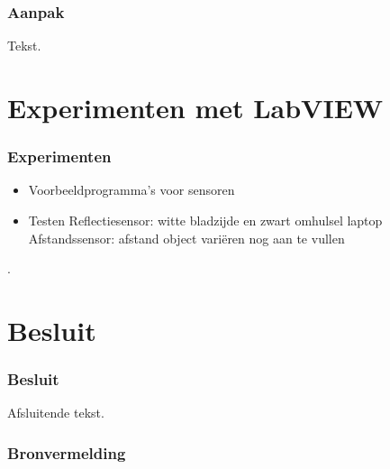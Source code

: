 \documentclass
   [kulak] %
   {kulakbeamer}
\begin{document}
\begin{frame}
\frametitle{Aanpak}
Tekst.
\end{frame}



\section[Experimenten]{Experimenten met LabVIEW}

\begin{frame}
	\frametitle{Experimenten}
	\begin{itemize}
		\item Voorbeeldprogramma's voor sensoren
		\item Testen
		\subitem Reflectiesensor: witte bladzijde en zwart omhulsel laptop
		\subitem Afstandssensor: afstand object variëren
		\subitem nog aan te vullen
	\end{itemize}.
\end{frame}



\section{Besluit}
\begin{frame}
\frametitle{Besluit}
Afsluitende tekst.
\end{frame}

\begin{frame}
\frametitle{Bronvermelding}
	
	
	
\end{frame}
\end{document}
